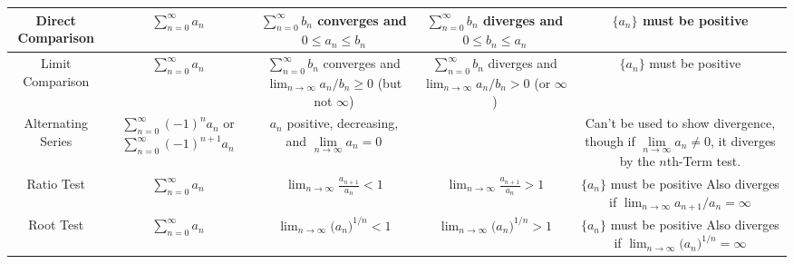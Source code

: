 \begin{tabular}{|c|c|c|c|c|}
Direct Comparison & \rule[-30pt]{0pt}{65pt}$\displaystyle{\sum^\infty_{n=0}{a_n}}$ & \parbox{1in}{\centering$\displaystyle \sum_{n=0}^\infty b_n $\\[3pt] converges and \\[3pt] $0\leq a_n\leq b_n$}%
& \parbox{1in}{\centering $\displaystyle \sum_{n=0}^\infty b_n$\\[3pt] diverges and \\[3pt] $0\leq b_n\leq a_n$} & $\{a_n\}$ must be positive\\\hline

Limit Comparison & \rule[-30pt]{0pt}{65pt}$\displaystyle{\sum^\infty_{n=0}{a_n}}$ & \parbox{1.3in}{\centering$\displaystyle \sum_{n=0}^\infty b_n $\\[3pt] converges and \\[3pt] $\displaystyle \lim_{n\to\infty} a_n/b_n  \geq 0$ (but not $\infty$)}%
& \parbox{1in}{\centering$\displaystyle \sum_{n=0}^\infty b_n$\\[3pt] diverges and \\[3pt] $\displaystyle \lim_{n\to\infty} a_n/b_n > 0$ (or $\infty$)}  & \parbox{1.5in}{\centering $\{a_n\}$ must be positive}\\ \hline

Alternating Series & \rule[-30pt]{0pt}{65pt}$\displaystyle{\sum^\infty_{n=0}{(-1)^n a_n}}$ or $\displaystyle{\sum^\infty_{n=0}{(-1)^{n+1} a_n}}$& \parbox{1.3in}{\centering $a_n$ positive, decreasing, and $\lim\limits_{n\rightarrow\infty}a_n=0$}%
& & \parbox{1.5in}{\centering Can't be used to show divergence, though if $\lim\limits_{n\rightarrow\infty}a_n\not=0$, it diverges by the $n$th-Term test.}\\ \hline

Ratio Test & \rule[-30pt]{0pt}{65pt}$\displaystyle{\sum^\infty_{n=0}{a_n}}$ &%
 \parbox{1.3in}{\centering$\displaystyle \lim_{n\to\infty} \frac{a_{n+1}}{a_n}  < 1$}%
& \parbox{1.3in}{\centering$\displaystyle \lim_{n\to\infty} \frac{a_{n+1}}{a_n} > 1$} & 
\parbox{1.5in}{\centering $\{a_n\}$ must be positive\\[3pt] Also diverges if\\[3pt] $\displaystyle \lim_{n\to\infty} a_{n+1}/a_n=\infty$}\\ \hline

Root Test & \rule[-30pt]{0pt}{65pt}$\displaystyle{\sum^\infty_{n=0}{a_n}}$ &%
 \parbox{1.3in}{\centering$\displaystyle \lim_{n\to\infty} \big(a_n\big)^{1/n}  < 1$}%
& \parbox{1.3in}{\centering$\displaystyle \lim_{n\to\infty} \big(a_n\big)^{1/n} > 1$} & 
\parbox{1.5in}{\centering $\{a_n\}$ must be positive\\[3pt] Also diverges if\\[3pt] $\displaystyle \lim_{n\to\infty} \big(a_n\big)^{1/n}=\infty$}\\ \hline

\end{tabular}


%
